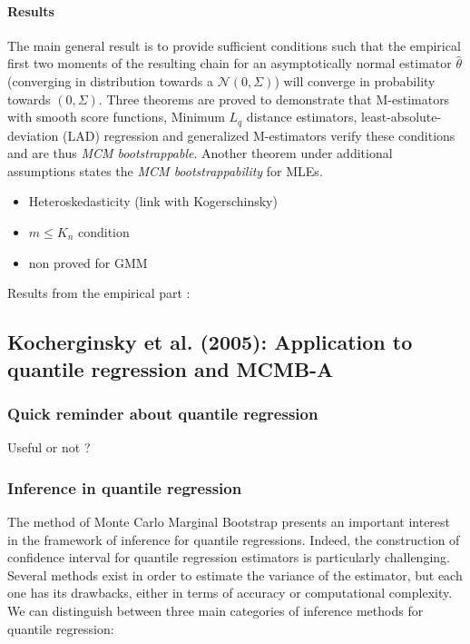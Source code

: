 \documentclass[11pt]{article}
\begin{document}
\paragraph{Results}
The main general result is to provide sufficient conditions such that the empirical first two moments of the resulting chain for an asymptotically normal estimator $\hat{\theta}$ (converging in distribution towards a $\mathcal{N}(0,\Sigma)$) will converge in probability towards $(0,\Sigma)$. Three theorems are proved to demonstrate that M-estimators with smooth score functions, Minimum $L_q$ distance estimators, least-absolute-deviation (LAD) regression and generalized M-estimators verify these conditions and are thus \emph{MCM bootstrappable}.
Another theorem under additional assumptions states the \emph{MCM bootstrappability} for MLEs. \\

\begin{itemize}
\item Heteroskedasticity (link with Kogerschinsky)
\item $m \leq K_n$ condition
\item non proved for GMM
\end{itemize}

Results from the empirical part : 





\subsection{Kocherginsky et al. (2005): Application to quantile regression and MCMB-A}


	\subsubsection{Quick reminder about quantile regression}
	
Useful or not	 ?


	\subsubsection{Inference in quantile regression}

The method of Monte Carlo Marginal Bootstrap presents an important interest in the framework of inference for quantile regressions. Indeed, the construction of confidence interval for quantile regression estimators is particularly challenging. Several methods exist in order to estimate the variance of the estimator, but each one has its drawbacks, either in terms of accuracy or computational complexity. We can distinguish between three main categories of inference methods for quantile regression:
\end{document}
